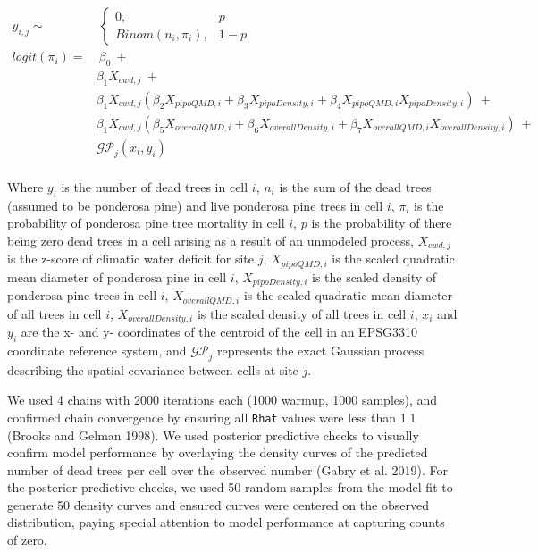 \documentclass[]{article}
\begin{document}
\[
\begin{aligned}
y_{i,j} \sim &\ \begin{cases}
0, & p \\
Binom(n_i, \pi_i), & 1-p
\end{cases} \\
logit(\pi_i) = &\ \beta_0\ + \\
& \beta_1X_{cwd, j}\ + \\
& \beta_1X_{cwd, j}(\beta_2X_{pipoQMD, i} + \beta_3X_{pipoDensity, i} + \beta_4X_{pipoQMD, i}X_{pipoDensity, i})\ + \\ 
& \beta_1X_{cwd, j}(\beta_5X_{overallQMD, i} + \beta_6X_{overallDensity, i} + \beta_7X_{overallQMD, i}X_{overallDensity, i})\ + \\
& \mathcal{GP}_j(x_i, y_i) \\
\end{aligned}
\]

Where \(y_i\) is the number of dead trees in cell \(i\), \(n_i\) is the
sum of the dead trees (assumed to be ponderosa pine) and live ponderosa
pine trees in cell \(i\), \(\pi_i\) is the probability of ponderosa pine
tree mortality in cell \(i\), \(p\) is the probability of there being
zero dead trees in a cell arising as a result of an unmodeled process,
\(X_{cwd, j}\) is the z-score of climatic water deficit for site \(j\),
\(X_{pipoQMD, i}\) is the scaled quadratic mean diameter of ponderosa
pine in cell \(i\), \(X_{pipoDensity, i}\) is the scaled density of
ponderosa pine trees in cell \(i\), \(X_{overallQMD, i}\) is the scaled
quadratic mean diameter of all trees in cell \(i\),
\(X_{overallDensity, i}\) is the scaled density of all trees in cell
\(i\), \(x_i\) and \(y_i\) are the x- and y- coordinates of the centroid
of the cell in an EPSG3310 coordinate reference system, and
\(\mathcal{GP}_j\) represents the exact Gaussian process describing the
spatial covariance between cells at site \(j\).

We used 4 chains with 2000 iterations each (1000 warmup, 1000 samples),
and confirmed chain convergence by ensuring all \texttt{Rhat} values
were less than 1.1 (Brooks and Gelman 1998). We used posterior
predictive checks to visually confirm model performance by overlaying
the density curves of the predicted number of dead trees per cell over
the observed number (Gabry et al. 2019). For the posterior predictive
checks, we used 50 random samples from the model fit to generate 50
density curves and ensured curves were centered on the observed
distribution, paying special attention to model performance at capturing
counts of zero.
\end{document}
